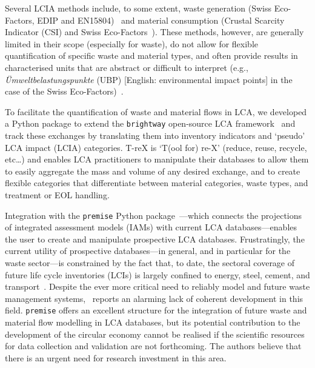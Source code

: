 Several LCIA methods include, to some extent, waste generation (Swiss Eco-Factors, EDIP and EN15804)~\citep{foen2021ecofactors,hauschild2003edip,cen2019en15804} and material consumption (Crustal Scarcity Indicator (CSI) and Swiss Eco-Factors~\citep{arvidsson2020csi,foen2021ecofactors}). These methods, however, are generally limited in their scope (especially for waste), do not allow for flexible quantification of specific waste and material types, and often provide results in characterised units that are abstract or difficult to interpret (e.g., \textit{Ümweltbelastungspunkte} (UBP) [English: environmental impact points] in the case of the Swiss Eco-Factors)~\citep{su2020sustainableproddev}.


To facilitate the quantification of waste and material flows in LCA, we developed a Python package to extend the \texttt{brightway} open-source LCA framework~\citep{mutel2017brightway} and track these exchanges by translating them into inventory indicators and `pseudo' LCA impact (LCIA) categories. T-reX is `T(ool for) re-X' (reduce, reuse, recycle, etc\ldots) and enables LCA practitioners to manipulate their databases to allow them to easily aggregate the mass and volume of any desired exchange, and to create flexible categories that differentiate between material categories, waste types, and treatment or EOL handling.

Integration with the \texttt{premise} Python package~\citep{sacchi2022premise}---which connects the projections of integrated assessment models (IAMs) with current LCA databases---enables the user to create and manipulate prospective LCA databases. Frustratingly, the current utility of prospective databases---in general, and in particular for the waste sector---is constrained by the fact that, to date, the sectoral coverage of future life cycle inventories (LCIs) is largely confined to energy, steel, cement, and transport~\citep{sacchi2023premisedocs}. Despite the ever more critical need to reliably model and future waste management systems,~\cite{bisinella2024wastelca} reports an alarming lack of coherent development in this field. \texttt{premise} offers an excellent structure for the integration of future waste and material flow modelling in LCA databases, but its potential contribution to the development of the circular economy cannot be realised if the scientific resources for data collection and validation are not forthcoming. The authors believe that there is an urgent need for research investment in this area.

